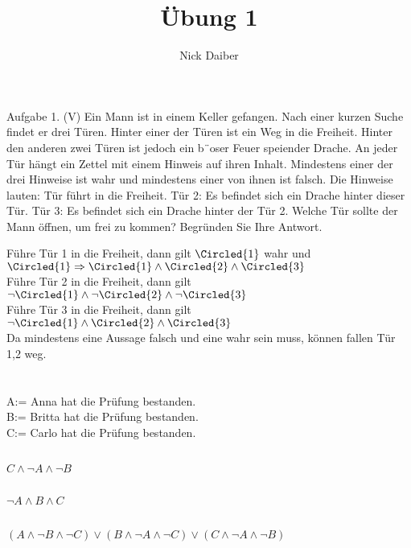 \documentclass{article}
\title{Übung 1}
\author{Nick Daiber}
\begin{document}
    \maketitle
    \section{}
    Aufgabe 1. (V) Ein Mann ist in einem Keller gefangen. Nach einer
    kurzen Suche findet er drei
    Türen. Hinter einer der Türen ist ein Weg in die Freiheit.
    Hinter den anderen zwei Türen ist
    jedoch ein b¨oser Feuer speiender Drache. An jeder Tür hängt ein Zettel
    mit einem Hinweis auf
    ihren Inhalt. Mindestens einer der drei Hinweise ist wahr und
    mindestens einer von ihnen ist falsch.
    Die Hinweise lauten:
    Tür führt in die Freiheit.
    Tür 2: Es befindet sich ein Drache hinter dieser Tür.
    Tür 3: Es befindet sich ein Drache hinter der Tür 2.
    Welche Tür sollte der Mann öffnen, um frei zu kommen? Begründen Sie Ihre
    Antwort.

    Führe Tür 1 in die Freiheit, dann gilt $\Circled{1}$ wahr
    und $\Circled{1} \Rightarrow \Circled{1} \land \Circled{2} \land \Circled{3}$\\
    Führe Tür 2 in die Freiheit, dann gilt 
    $\neg\Circled{1}\land \neg \Circled{2} \land \neg \Circled{3}$\\
    Führe Tür 3 in die Freiheit, dann gilt $\neg\Circled{1}\land \Circled{2} \land \Circled{3}$\\
    Da mindestens eine Aussage falsch und eine wahr sein muss, können fallen Tür 1,2 weg.

    \section{}
    A:= Anna hat die Prüfung bestanden.\\
    B:= Britta hat die Prüfung bestanden.\\
    C:= Carlo hat die Prüfung bestanden.\\
    \subsection{}
    $C\land\neg A\land \neg B$
    \subsection{}
    $\neg A \land B \land C$
    \subsection{}
    $(A \land \neg B \land \neg C) \lor (B \land \neg A \land \neg C) \lor
    (C \land \neg A \land \neg B)$
\end{document}
